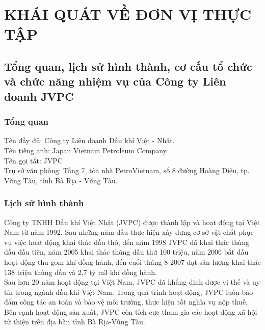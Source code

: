 \documentclass[12pt,a4paper]{report}
\begin{document}
\chapter{KHÁI QUÁT VỀ ĐƠN VỊ THỰC TẬP}
\section{Tổng quan, lịch sử hình thành, cơ cấu tổ chức và chức năng nhiệm vụ của Công ty Liên doanh JVPC}
\subsection{Tổng quan}
Tên đầy đủ: Công ty Liên doanh Dầu khí Việt - Nhật.\\
Tên tiếng anh: Japan Vietnam Petroleum Company.\\
Tên gọi tắt: JVPC\\
Trụ sở văn phòng: Tầng 7, tòa nhà PetroVietnam, số 8 đường Hoàng Diệu, tp. Vũng Tàu, tỉnh Bà Rịa - Vũng Tàu.

\subsection{Lịch sử hình thành}
Công ty TNHH Dầu khí Việt Nhật (JVPC) được thành lập và hoạt động tại Việt Nam từ năm 1992. Sau những năm đầu thực hiện xây dựng cơ sở vật chất phục vụ việc hoạt động khai thác dầu thô, đến năm 1998 JVPC đã khai thác thùng dầu đầu tiên, năm 2005 khai thác thùng dầu thứ 100 triệu, năm 2006 bắt đầu hoạt động thu gom khí đồng hành, đến cuối tháng 8-2007 đạt sản lượng khai thác 138 triệu thùng dầu và 2,7 tỷ m3 khí đồng hành.\\
Sau hơn 20 năm hoạt động tại Việt Nam, JVPC đã khẳng định được vị thế và uy tín trong ngành dầu khí Việt Nam. Trong quá trình hoạt động, JVPC luôn bảo đảm công tác an toàn và bảo vệ môi trường, thực hiện tốt nghĩa vụ nộp thuế. Bên cạnh hoạt động sản xuất, JVPC còn tích cực tham gia các hoạt động xã hội từ thiện trên địa bàn tỉnh Bà Rịa-Vũng Tàu.
\end{document}
